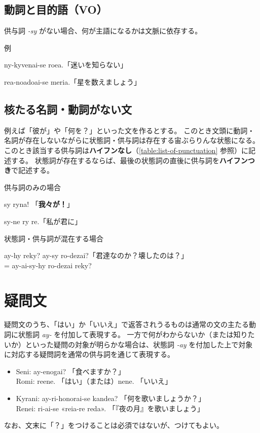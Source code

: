 \subsection{動詞と目的語（VO）}
供与詞 \emph{-sy} がない場合、何が主語になるかは文脈に依存する。

\begin{itembox}[l]{例}
    \begin{pindent}
        \noindent
        ny-kyvenai-se roea.「迷いを知らない」

        \noindent
        rea-noadoai-se meria.「星を数えましょう」
    \end{pindent}
\end{itembox}

\subsection{核たる名詞・動詞がない文}
\label{section:sentence-without-noun-verb}

例えば「彼が」や「何を？」といった文を作るとする。
このとき文頭に動詞・名詞が存在しないながらに状態詞・供与詞は存在する宙ぶらりんな状態になる。
このとき該当する供与詞は\textbf{ハイフンなし}（\cref{table:list-of-punctuation} 参照）に記述する。
状態詞が存在するならば、最後の状態詞の直後に供与詞を\textbf{ハイフンつき}で記述する。

\begin{itembox}[l]{供与詞のみの場合}
    \begin{pindent}
        \noindent
        sy ryna! 「\textbf{我々が！}」

        \noindent
        sy-ne ry re.「私が君に」
    \end{pindent}
\end{itembox}

\begin{itembox}[l]{状態詞・供与詞が混在する場合}
    \begin{pindent}
        \noindent
        ay-hy reky? ay-sy ro-dezai?「君達なのか？壊したのは？」\\
        = ay-ai-sy-hy ro-dezai reky?
    \end{pindent}
\end{itembox}

\section{疑問文}

疑問文のうち、「はい」か「いいえ」で返答されうるものは通常の文の主たる動詞に状態詞 \emph{ay-} を付加して表現する。
一方で何がわからないか（または知りたいか）といった疑問の対象が明らかな場合は、状態詞 \emph{-ay} を付加した上で対象に対応する疑問詞を通常の供与詞を通じて表現する。

\begin{itemize}
    \item Seni: ay-enogai? 「食べますか？」 \\ Romi: reene. 「はい」（または）nene. 「いいえ」
    \item Kyrani: ay-ri-honorai-se kandea? 「何を歌いましょうか？」\\ Renei: ri-ai-se «reia-re reda». 「『夜の月』を歌いましょう」
\end{itemize}

なお、文末に「？」をつけることは必須ではないが、つけてもよい。